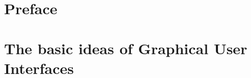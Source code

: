 \documentclass[showtrims]{memoir}
\begin{document}
\thispagestyle{empty}


\frontmatter

\chapter*{Preface}
\label{chap:preface}

\newpage



\setcounter{tocdepth}{3}
\tableofcontents
\newpage



\graphicspath{
  {ch-Preface/}
  {ch-GUIBasics/}
  {ch-ProgrammingPractices/}
  {ch-gWidgets/}
  {ch-RGtk2/}
  {ch-RwxWidgets/}
  {ch-tcltk/}
  {ch-WebGUIs/}
}


\mainmatter
\chapter{The basic ideas of Graphical User Interfaces}
\label{chap:GUIBasics}






\label{chap:gWidgets-intro}



\label{chap:RGtk2}


\label{chap:Qt}

\end{document}
